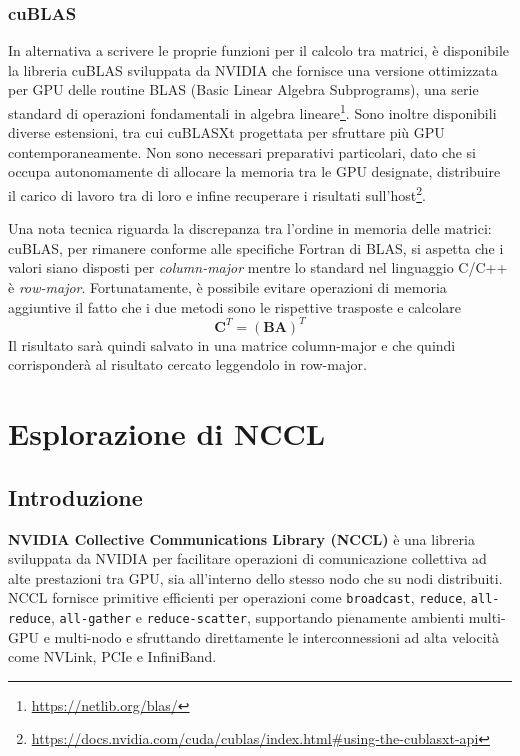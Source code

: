\documentclass[a4paper]{article}
\begin{document}
\subsubsection{cuBLAS}
In alternativa a scrivere le proprie funzioni per il calcolo tra matrici, è disponibile la libreria cuBLAS sviluppata da NVIDIA che fornisce una versione ottimizzata per GPU delle routine BLAS (Basic Linear Algebra Subprograms), una serie standard di operazioni fondamentali in algebra lineare\footnote{\url{https://netlib.org/blas/}}. Sono inoltre disponibili diverse estensioni, tra cui cuBLASXt progettata per sfruttare più GPU contemporaneamente. Non sono necessari preparativi particolari, dato che si occupa autonomamente di allocare la memoria tra le GPU designate, distribuire il carico di lavoro tra di loro e infine recuperare i risultati sull'host\footnote{\url{https://docs.nvidia.com/cuda/cublas/index.html\#using-the-cublasxt-api}}.

Una nota tecnica riguarda la discrepanza tra l'ordine in memoria delle matrici: cuBLAS, per rimanere conforme alle specifiche Fortran di BLAS, si aspetta che i valori siano disposti per \textit{column-major} mentre lo standard nel linguaggio C/C++ è \textit{row-major}. Fortunatamente, è possibile evitare operazioni di memoria aggiuntive il fatto che i due metodi sono le rispettive trasposte e calcolare
$$
    \mathbf{C}^T=(\mathbf{B}\mathbf{A})^T
$$
Il risultato sarà quindi salvato in una matrice column-major e che quindi corrisponderà al risultato cercato leggendolo in row-major.



\section{Esplorazione di NCCL}

\subsection{Introduzione}

\textbf{NVIDIA Collective Communications Library (NCCL)} è una libreria sviluppata da NVIDIA per facilitare operazioni di comunicazione collettiva ad alte prestazioni tra GPU, sia all'interno dello stesso nodo che su nodi distribuiti. NCCL fornisce primitive efficienti per operazioni come \texttt{broadcast}, \texttt{reduce}, \texttt{all-reduce}, \texttt{all-gather} e \texttt{reduce-scatter}, supportando pienamente ambienti multi-GPU e multi-nodo e sfruttando direttamente le interconnessioni ad alta velocità come NVLink, PCIe e InfiniBand.
\end{document}
